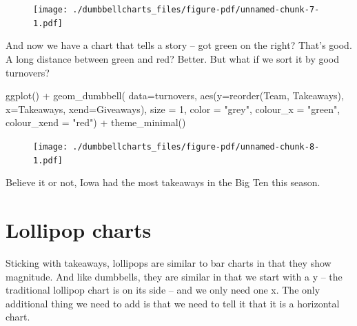 \documentclass[
  letterpaper,
  DIV=11,
  numbers=noendperiod]{scrreprt}
\newenvironment{Shaded}{\begin{snugshade}}{\end{snugshade}}
\newcommand{\AttributeTok}[1]{\textcolor[rgb]{0.40,0.45,0.13}{#1}}
\newcommand{\DecValTok}[1]{\textcolor[rgb]{0.68,0.00,0.00}{#1}}
\newcommand{\FunctionTok}[1]{\textcolor[rgb]{0.28,0.35,0.67}{#1}}
\newcommand{\NormalTok}[1]{\textcolor[rgb]{0.00,0.23,0.31}{#1}}
\newcommand{\SpecialCharTok}[1]{\textcolor[rgb]{0.37,0.37,0.37}{#1}}
\newcommand{\StringTok}[1]{\textcolor[rgb]{0.13,0.47,0.30}{#1}}
\begin{document}
\begin{figure}[H]

{\centering \texttt{[image: ./dumbbellcharts\_files/figure-pdf/unnamed-chunk-7-1.pdf]}

}

\end{figure}

And now we have a chart that tells a story -- got green on the right?
That's good. A long distance between green and red? Better. But what if
we sort it by good turnovers?

\begin{Shaded}
\begin{Highlighting}[]
\FunctionTok{ggplot}\NormalTok{() }\SpecialCharTok{+} 
  \FunctionTok{geom\_dumbbell}\NormalTok{(}
    \AttributeTok{data=}\NormalTok{turnovers, }
    \FunctionTok{aes}\NormalTok{(}\AttributeTok{y=}\FunctionTok{reorder}\NormalTok{(Team, Takeaways), }\AttributeTok{x=}\NormalTok{Takeaways, }\AttributeTok{xend=}\NormalTok{Giveaways),}
    \AttributeTok{size =} \DecValTok{1}\NormalTok{,}
    \AttributeTok{color =} \StringTok{"grey"}\NormalTok{,}
    \AttributeTok{colour\_x =} \StringTok{"green"}\NormalTok{,}
    \AttributeTok{colour\_xend =} \StringTok{"red"}\NormalTok{) }\SpecialCharTok{+} 
  \FunctionTok{theme\_minimal}\NormalTok{()}
\end{Highlighting}
\end{Shaded}

\begin{figure}[H]

{\centering \texttt{[image: ./dumbbellcharts\_files/figure-pdf/unnamed-chunk-8-1.pdf]}

}

\end{figure}

Believe it or not, Iowa had the most takeaways in the Big Ten this
season.

\hypertarget{lollipop-charts}{%
\section{Lollipop charts}\label{lollipop-charts}}

Sticking with takeaways, lollipops are similar to bar charts in that
they show magnitude. And like dumbbells, they are similar in that we
start with a y -- the traditional lollipop chart is on its side -- and
we only need one x. The only additional thing we need to add is that we
need to tell it that it is a horizontal chart.
\end{document}
